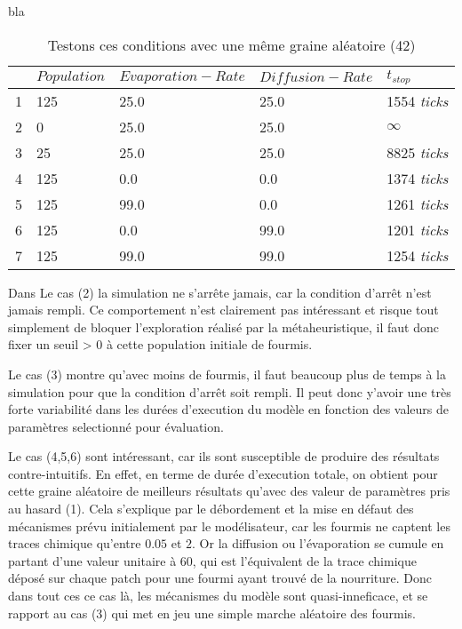 \begin{framewithtitle}[bla]{bla}
\begin{table}[H]
\centering
\caption{Testons ces conditions avec une même graine aléatoire (42)}
\label{tab:experience}
\begin{tabular}{lllll}
\hline
  & $Population$ & $Evaporation-Rate$ & $Diffusion-Rate$ & $t_{stop}$ \\ \hline
1 & 125        & 25.0             & 25.0  & 1554 \textit{ticks} \\
2 & 0          & 25.0             & 25.0  & $\infty$ \\
3 & 25         & 25.0             & 25.0  & 8825 \textit{ticks} \\
4 & 125        & 0.0              & 0.0   & 1374 \textit{ticks} \\
5 & 125        & 99.0             & 0.0   & 1261 \textit{ticks} \\
6 & 125        & 0.0              & 99.0  & 1201 \textit{ticks} \\ 
7 & 125        & 99.0             & 99.0  & 1254 \textit{ticks} \\ \hline
\end{tabular}
\end{table}

Dans Le cas (2) la simulation ne s'arrête jamais, car la condition d'arrêt n'est jamais rempli. Ce comportement n'est clairement pas intéressant et risque tout simplement de bloquer l'exploration réalisé par la métaheuristique, il faut donc fixer un seuil > 0 à cette population initiale de fourmis.

Le cas (3) montre qu'avec moins de fourmis, il faut beaucoup plus de temps à la simulation pour que la condition d'arrêt soit rempli. Il peut donc y'avoir une très forte variabilité dans les durées d'execution du modèle en fonction des valeurs de paramètres selectionné pour évaluation.

Le cas (4,5,6) sont intéressant, car ils sont susceptible de produire des résultats contre-intuitifs. En effet, en terme de durée d'execution totale, on obtient pour cette graine aléatoire de meilleurs résultats qu'avec des valeur de paramètres pris au hasard (1). Cela s'explique par le débordement et la mise en défaut des mécanismes prévu initialement par le modélisateur, car les fourmis ne captent les traces chimique qu'entre $0.05$ et $2$. Or la diffusion ou l'évaporation se cumule en partant d'une valeur unitaire à $60$, qui est l'équivalent de la trace chimique déposé sur chaque patch pour une fourmi ayant trouvé de la nourriture. Donc dans tout ces ce cas là, les mécanismes du modèle sont quasi-inneficace, et se rapport au cas (3) qui met en jeu une simple marche aléatoire des fourmis.


\end{framewithtitle}
